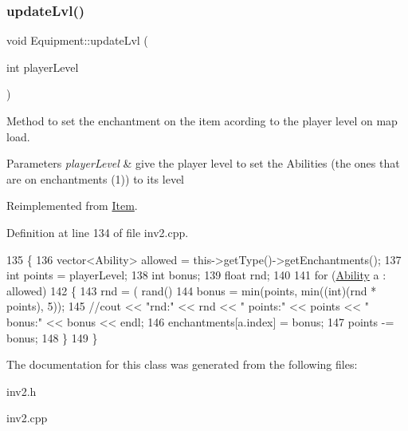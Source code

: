 \subsubsection{\texorpdfstring{update\+Lvl()}{updateLvl()}}
{\footnotesize\ttfamily void Equipment\+::update\+Lvl (\begin{DoxyParamCaption}\item[{int}]{player\+Level }\end{DoxyParamCaption})\hspace{0.3cm}{\ttfamily [virtual]}}



Method to set the enchantment on the item acording to the player level on map load. 


\begin{DoxyParams}{Parameters}
{\em player\+Level} & give the player level to set the Abilities (the ones that are on enchantments (1)) to it\textquotesingle{}s level \\
\hline
\end{DoxyParams}


Reimplemented from \hyperlink{class_item}{Item}.



Definition at line 134 of file inv2.\+cpp.


\begin{DoxyCode}
135 \{
136     vector<Ability> allowed = this->getType()->getEnchantments();
137     \textcolor{keywordtype}{int} points = playerLevel;
138     \textcolor{keywordtype}{int} bonus;
139     \textcolor{keywordtype}{float} rnd;
140 
141     \textcolor{keywordflow}{for} (\hyperlink{class_ability}{Ability} a : allowed)
142     \{
143         rnd = ( rand() %
144         bonus = min(points, min((\textcolor{keywordtype}{int})(rnd * points), 5));
145         \textcolor{comment}{//cout << "rnd:" << rnd << "  points:" << points << "  bonus:" << bonus << endl;}
146         enchantments[a.index] = bonus;
147         points -= bonus;
148     \}
149 \}
\end{DoxyCode}


The documentation for this class was generated from the following files\+:\begin{DoxyCompactItemize}
\item 
inv2.\+h\item 
inv2.\+cpp\end{DoxyCompactItemize}
